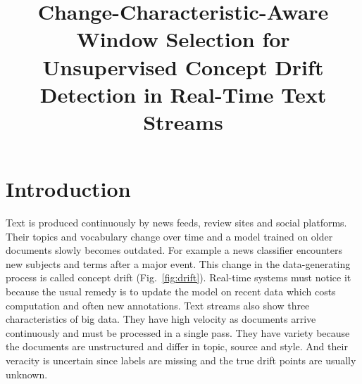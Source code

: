 \documentclass[conference]{IEEEtran}
\begin{document}
\title{Change-Characteristic-Aware Window Selection for Unsupervised Concept Drift Detection in Real-Time Text Streams}

\makeatletter
\newcommand{\linebreakand}{\end{@IEEEauthorhalign}\hfill\mbox{}\par\mbox{}\hfill\begin{@IEEEauthorhalign}}
\makeatother


\maketitle

\section{Introduction}

Text is produced continuously by news feeds, review sites and social platforms. Their topics and vocabulary change over time and a model trained on older documents slowly becomes outdated. For example a news classifier encounters new subjects and terms after a major event. This change in the data-generating process is called concept drift \cite{gama2014,lu2019} (Fig.~\ref{fig:drift}). Real-time systems must notice it because the usual remedy is to update the model on recent data which costs computation and often new annotations. Text streams also show three characteristics of big data. They have high velocity as documents arrive continuously and must be processed in a single pass. They have variety because the documents are unstructured and differ in topic, source and style. And their veracity is uncertain since labels are missing and the true drift points are usually unknown.
\end{document}
